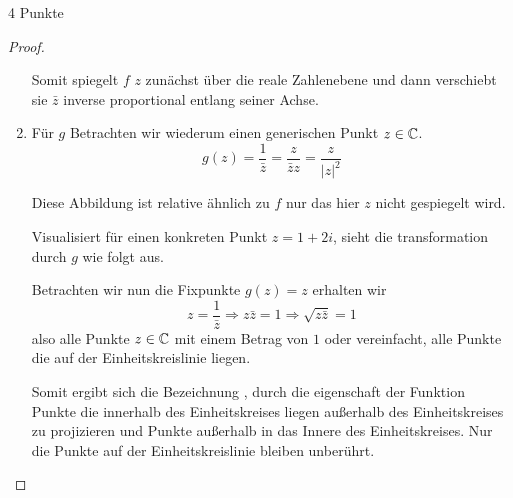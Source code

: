 \documentclass{problemset}
\begin{document}
\begin{problem}[Einheitskreis]{4 Punkte}
\begin{proof}
\begin{enumerate}
              Somit spiegelt $f$ $z$ zunächst über die reale Zahlenebene und dann verschiebt
              sie $\bar{z}$ inverse proportional entlang seiner Achse.

        \item Für $g$ Betrachten wir wiederum einen generischen Punkt $z \in \mathbb{C}$. \[
                  g(z) = \frac{1}{\bar{z}} = \frac{z}{\bar{z}z} = \frac{z}{{|z|}^2}
              \]

              Diese Abbildung ist relative ähnlich zu $f$ nur das hier $z$ nicht gespiegelt
              wird.

              Visualisiert für einen konkreten Punkt $z = 1 + 2i$, sieht die transformation
              durch $g$ wie folgt aus.


              Betrachten wir nun die Fixpunkte $g(z) = z$ erhalten wir \[
                  z = \frac{1}{\bar{z}} \Rightarrow z \bar{z} = 1 \Rightarrow \sqrt{z \bar{z}} = 1
              \] also alle Punkte $z \in \mathbb{C}$ mit einem Betrag von $1$ oder vereinfacht,
              alle Punkte die auf der Einheitskreislinie liegen.

              Somit ergibt sich die Bezeichnung ,
              durch die eigenschaft der Funktion Punkte die innerhalb des Einheitskreises
              liegen außerhalb des Einheitskreises zu projizieren und Punkte außerhalb in das
              Innere des Einheitskreises. Nur die Punkte auf der Einheitskreislinie bleiben
              unberührt.


\end{enumerate}
\end{proof}
\end{problem}
\end{document}
